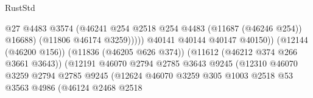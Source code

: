 \begin{lexlean}{RustStd}
\begin{coremodule}
                                                            @27
                                                            @4483
                                                            @3574
                                                            (@46241
                                                              @254
                                                              @2518
                                                              @254
                                                              @4483
                                                              (@11687 (@46246 @254))
                                                              @16688)
                                                            (@11806 @46174 @3259)))))
                                                    @40141
                                                    @40144
                                                    @40147
                                                    @40150))
                                                (@12144 (@46200 @156))
                                                (@11836 (@46205 @626 @374))
                                                (@11612 (@46212 @374 @266 @3661 @3643))
                                                (@12191
                                                  @46070
                                                  @2794
                                                  @2785
                                                  @3643
                                                  @9245
                                                  (@12310
                                                    @46070
                                                    @3259
                                                    @2794
                                                    @2785
                                                    @9245
                                                    (@12624
                                                      @46070
                                                      @3259
                                                      @305
                                                      @1003
                                                      @2518
                                                      @53
                                                      @3563
                                                      @4986
                                                      (@46124
                                                        @2468
                                                        @2518

\end{coremodule}
\end{lexlean}
